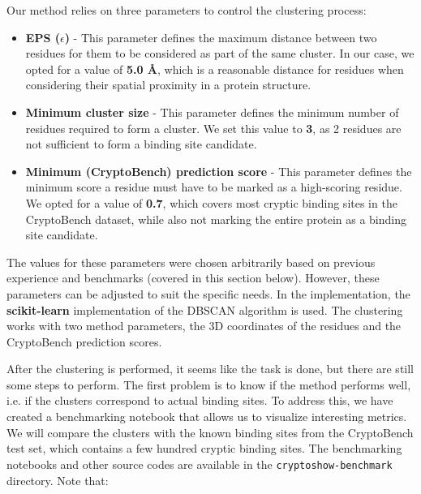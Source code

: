 Our method relies on three parameters to control the clustering process:
\begin{itemize}
    \item \textbf{EPS ($\epsilon$)} - This parameter defines the maximum distance between two residues for them to be considered as part of the same cluster. In our case, we opted for a value of \textbf{5.0 \AA}, which is a reasonable distance for residues when considering their spatial proximity in a protein structure.
    \item \textbf{Minimum cluster size} - This parameter defines the minimum number of residues required to form a cluster. We set this value to \textbf{3}, as 2 residues are not sufficient to form a binding site candidate.
    \item \textbf{Minimum (CryptoBench) prediction score} - This parameter defines the minimum score a residue must have to be marked as a high-scoring residue. We opted for a value of \textbf{0.7}, which covers most cryptic binding sites in the CryptoBench dataset, while also not marking the entire protein as a binding site candidate.
\end{itemize}

The values for these parameters were chosen arbitrarily based on previous experience and benchmarks (covered in this section below). However, these parameters can be adjusted to suit the specific needs. In the implementation, the \textbf{scikit-learn} implementation of the DBSCAN algorithm is used. The clustering works with two method parameters, the 3D coordinates of the residues and the CryptoBench prediction scores.

After the clustering is performed, it seems like the task is done, but there are still some steps to perform. The first problem is to know if the method performs well, i.e. if the clusters correspond to actual binding sites. To address this, we have created a benchmarking notebook that allows us to visualize interesting metrics. We will compare the clusters with the known binding sites from the CryptoBench test set, which contains a few hundred cryptic binding sites. The benchmarking notebooks and other source codes are available in the \lstinline!cryptoshow-benchmark! directory. Note that:

